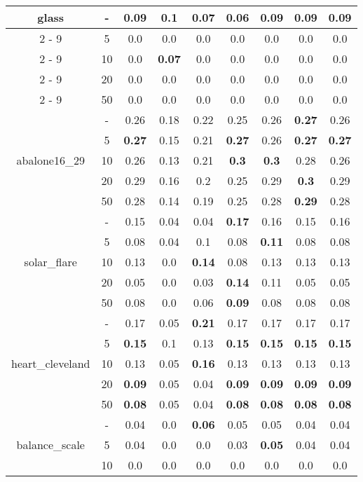 \documentclass{article}%
\begin{document}
\begin{tabular}{c|c|ccccccc}
\hline%
\multirow{5}{*}{glass}&{-}&0.09&\textbf{0.1}&0.07&0.06&0.09&0.09&0.09\\%
\cline{2%
-%
9}%
&5&0.0&0.0&0.0&0.0&0.0&0.0&0.0\\%
\cline{2%
-%
9}%
&10&0.0&\textbf{0.07}&0.0&0.0&0.0&0.0&0.0\\%
\cline{2%
-%
9}%
&20&0.0&0.0&0.0&0.0&0.0&0.0&0.0\\%
\cline{2%
-%
9}%
&50&0.0&0.0&0.0&0.0&0.0&0.0&0.0\\%
\hline%
\multirow{5}{*}{abalone16\_29}&{-}&0.26&0.18&0.22&0.25&0.26&\textbf{0.27}&0.26\\%
\cline{2%
-%
9}%
&5&\textbf{0.27}&0.15&0.21&\textbf{0.27}&0.26&\textbf{0.27}&\textbf{0.27}\\%
\cline{2%
-%
9}%
&10&0.26&0.13&0.21&\textbf{0.3}&\textbf{0.3}&0.28&0.26\\%
\cline{2%
-%
9}%
&20&0.29&0.16&0.2&0.25&0.29&\textbf{0.3}&0.29\\%
\cline{2%
-%
9}%
&50&0.28&0.14&0.19&0.25&0.28&\textbf{0.29}&0.28\\%
\hline%
\multirow{5}{*}{solar\_flare}&{-}&0.15&0.04&0.04&\textbf{0.17}&0.16&0.15&0.16\\%
\cline{2%
-%
9}%
&5&0.08&0.04&0.1&0.08&\textbf{0.11}&0.08&0.08\\%
\cline{2%
-%
9}%
&10&0.13&0.0&\textbf{0.14}&0.08&0.13&0.13&0.13\\%
\cline{2%
-%
9}%
&20&0.05&0.0&0.03&\textbf{0.14}&0.11&0.05&0.05\\%
\cline{2%
-%
9}%
&50&0.08&0.0&0.06&\textbf{0.09}&0.08&0.08&0.08\\%
\hline%
\multirow{5}{*}{heart\_cleveland}&{-}&0.17&0.05&\textbf{0.21}&0.17&0.17&0.17&0.17\\%
\cline{2%
-%
9}%
&5&\textbf{0.15}&0.1&0.13&\textbf{0.15}&\textbf{0.15}&\textbf{0.15}&\textbf{0.15}\\%
\cline{2%
-%
9}%
&10&0.13&0.05&\textbf{0.16}&0.13&0.13&0.13&0.13\\%
\cline{2%
-%
9}%
&20&\textbf{0.09}&0.05&0.04&\textbf{0.09}&\textbf{0.09}&\textbf{0.09}&\textbf{0.09}\\%
\cline{2%
-%
9}%
&50&\textbf{0.08}&0.05&0.04&\textbf{0.08}&\textbf{0.08}&\textbf{0.08}&\textbf{0.08}\\%
\hline%
\multirow{5}{*}{balance\_scale}&{-}&0.04&0.0&\textbf{0.06}&0.05&0.05&0.04&0.04\\%
\cline{2%
-%
9}%
&5&0.04&0.0&0.0&0.03&\textbf{0.05}&0.04&0.04\\%
\cline{2%
-%
9}%
&10&0.0&0.0&0.0&0.0&0.0&0.0&0.0\\%

\end{tabular}
\end{document}

